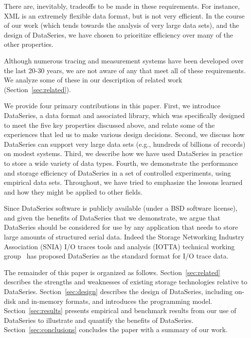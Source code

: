 \documentclass{acm_proc_article-sp}
\begin{document}
There are, inevitably, tradeoffs to be made in these requirements. For
instance, XML is an extremely flexible data format, but is not very
efficient. In the course of our work (which tends towards the analysis
of very large data sets), and the design of DataSeries, we have chosen
to prioritize efficiency over many of the other properties.

Although numerous tracing and measurement systems have been developed
over the last 20-30 years, we are not aware of any that meet all of
these requirements. We analyze some of these in our description of
related work (Section~\ref{sec:related}).

We provide four primary contributions in this paper.  First, we
introduce DataSeries, a data format and associated library, which was
specifically designed to meet the five key properties discussed above,
and relate some of the experiences that led us to make various
design decisions. 
Second, we discuss how DataSeries can support very large data sets
(e.g., hundreds of billions of records) on modest systems.  Third, we
describe how we have used DataSeries in practice to store a wide
variety of data types.  Fourth, we demonstrate the performance and
storage efficiency of DataSeries in a set of controlled experiments,
using empirical data sets. Throughout, we have tried to emphasize the
lessons learned and how they might be applied to other fields.

Since DataSeries software is publicly available (under a BSD software
license), and given the benefits of DataSeries that we demonstrate, we
argue that DataSeries should be considered for use by any application
that needs to store large amounts of structured serial data. Indeed
the Storage Networking Industry Association (SNIA) I/O traces tools
and analysis (IOTTA) technical working group~\cite{iotta-website} has
proposed DataSeries as the standard format for I/O trace data.

The remainder of this paper is organized as follows.
Section~\ref{sec:related} describes the strengths and weaknesses of
existing storage technologies relative to DataSeries.
Section~\ref{sec:design} describes the design of DataSeries, including
on-disk and in-memory formats, and introduces the programming model.
Section~\ref{sec:results} presents empirical and benchmark results
from our use of DataSeries to illustrate and quantify the benefits of
DataSeries. Section~\ref{sec:conclusions} concludes the
paper with a summary of our work.
\end{document}
